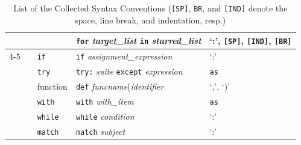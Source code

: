 \begin{table}[!t]
\begin{tabular}{m{2cm}m{4cm}m{1.8cm}m{4cm}m{3.5cm}}
         
         &  &  & \texttt{for} \textit{target\_list} \texttt{in} \textit{starred\_list}   &  `:', \texttt{[SP]}, \texttt{[IND]},  \texttt{[BR]} \\\cmidrule{4-5}


         & & \multirow{1}{*}{\texttt{if}} & \texttt{if} \textit{assignment\_expression} & `:'\\
         & & \texttt{try} & \texttt{try:} \textit{suite} \texttt{except} \textit{expression}  &  \texttt{as} \\
         &   & function & \texttt{def} \textit{funcname}(\textit{identifier} & `,', `)' \\
         &   & \multirow{1}{*}{\texttt{with}} & \texttt{with} \textit{with\_item} & \texttt{as} \\

         &   & \multirow{1}{*}{\texttt{while}} & \texttt{while} \textit{condition} & `:'\\
         & & \multirow{1}{*}{\texttt{match}} & \texttt{match} \textit{subject} & `:' \\
        \bottomrule
    \end{tabular}\caption{List of the Collected Syntax Conventions (\texttt{[SP]}, \texttt{BR}, and \texttt{[IND]} denote the space, line break, and indentation, resp.)}\label{table:syntax}
\end{table}
